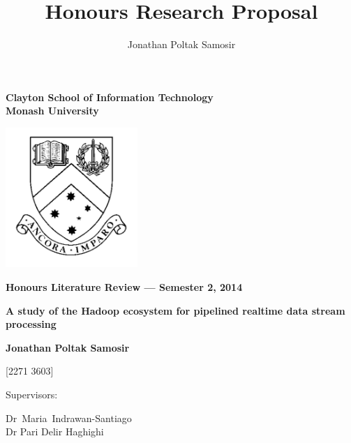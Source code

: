 \documentclass[a4paper,11pt]{article}
\author{Jonathan Poltak Samosir}
\title{Honours Research Proposal}
\begin{document}
\thispagestyle{empty} %
\renewcommand{\thepage}{\roman{page}}

\begin{spacing}{1.5}
\begin{center}
{\Large \bfseries
Clayton School of Information Technology\\
Monash University}

\vspace*{30mm}

\includegraphics[width=5cm]{img/MonashCrest.pdf}

\vspace*{15mm}

{\large \bfseries
Honours Literature Review --- Semester 2, 2014
}

\vspace*{10mm}

{\LARGE \bfseries
A study of the Hadoop ecosystem for pipelined realtime data stream processing
}

\vspace*{20mm}

{\large \bfseries
Jonathan Poltak Samosir

[2271 3603]

\vspace*{20mm}

Supervisors: \parbox[t]{50mm}{\mbox{Dr Maria Indrawan-Santiago}\\Dr Pari Delir Haghighi}
}

\end{center}
\end{spacing}

\newpage

\tableofcontents

\newpage
\setcounter{page}{1}
\renewcommand{\thepage}{\arabic{page}}


\end{document}
